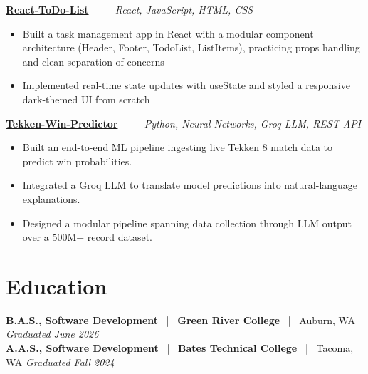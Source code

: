 \documentclass[10pt, letterpaper]{article}
\newcommand{\jobhead}[4]{%
  \vspace{5pt}%
  {\bfseries\color{dark}#1}%
  ~{\color{light}|}~%
  {\bfseries\color{navy}#2}%
  ~{\color{light}|}~%
  {\color{light}#3}%
  \hfill{\color{light}\small\textit{#4}}\\[-2pt]%
}
\newcommand{\projhead}[3]{%
  \vspace{5pt}%
  {\bfseries\color{dark}\href{#2}{#1}}%
  ~{\color{light}---}~%
  {\color{light}\small\textit{#3}}\\[-2pt]%
}
\begin{document}
\projhead{React-ToDo-List}{https://github.com/timmyd4/React-TodoList-Fall2025}{React, JavaScript, HTML, CSS}
\begin{itemize}
  \item Built a task management app in React with a modular component architecture (Header, Footer, TodoList, ListItems), practicing props handling and clean separation of concerns
  \item Implemented real-time state updates with useState and styled a responsive dark-themed UI from scratch
\end{itemize}

\projhead{Tekken-Win-Predictor}{}{Python, Neural Networks, Groq LLM, REST API}
\begin{itemize}
  \item Built an end-to-end ML pipeline ingesting live Tekken 8 match data to predict win probabilities.
  \item Integrated a Groq LLM to translate model predictions into natural-language explanations.
  \item Designed a modular pipeline spanning data collection through LLM output over a 500M+ record dataset.
\end{itemize}

\section{Education}

\jobhead{B.A.S., Software Development}{Green River College}{Auburn, WA}{Graduated June 2026}
\jobhead{A.A.S., Software Development}{Bates Technical College}{Tacoma, WA}{Graduated Fall 2024}
\end{document}
